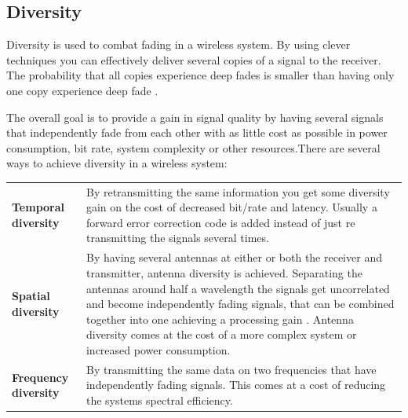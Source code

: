 %
%
%
%

\subsection{Diversity}
\label{div_chap}
Diversity is used to combat fading in a wireless system. By using clever techniques you can effectively deliver several copies of a signal to the receiver. The probability that all copies experience deep fades is smaller than having only one copy experience deep fade \citep[p. 4-6]{diversityFuture}.

The overall goal is to provide a gain in signal quality by having several signals that independently fade from each other with as little cost as possible in power consumption, bit rate, system complexity or other resources.There are several ways to achieve diversity in a wireless system:
 
\begin{tabular}{lp{13.1cm}}
\textbf{Temporal diversity} & By retransmitting the same information you get some diversity gain on the cost of decreased bit/rate and latency. Usually a forward error correction code is added instead of just re transmitting the signals several times. \\
\textbf{Spatial diversity} & By having several antennas at either or both the receiver and transmitter, antenna diversity is achieved. Separating the antennas around half a wavelength the signals get uncorrelated and become independently fading signals, that can be combined together into one achieving a processing gain \citep{diversityAntenna}. Antenna diversity comes at the cost of a more complex system or increased power consumption.\\
\textbf{Frequency diversity} & By transmitting the same data on two frequencies that have independently fading signals. This comes at a cost of reducing the systems spectral efficiency.
\end{tabular}


